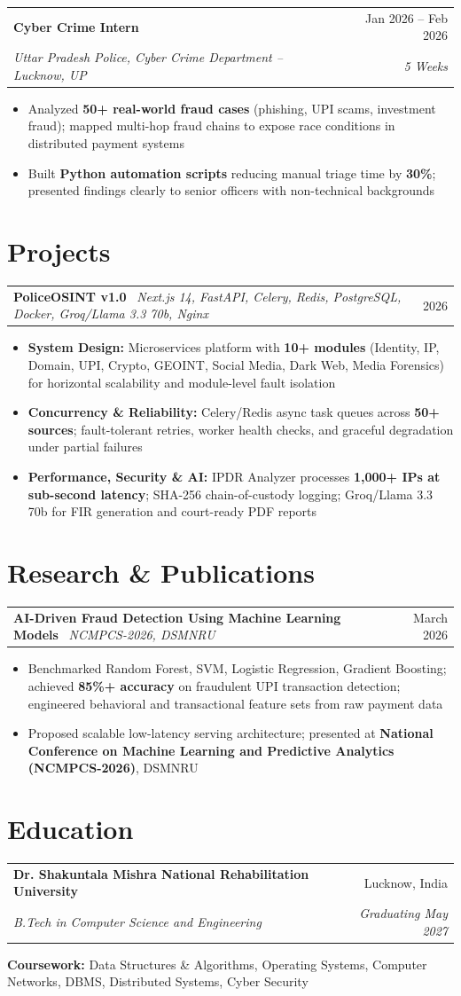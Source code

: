 \documentclass[letterpaper,10pt]{article}
\makeatletter
\newcommand{\rI}[1]{\item\small{#1}}
\newcommand{\rSH}[4]{%
  \vspace{1.5pt}\noindent
  \begin{tabular*}{\textwidth}{@{}l@{\extracolsep{\fill}}r@{}}
    \textbf{\small #1} & \small #2 \\[0.3pt]
    \textit{\small #3} & \textit{\small #4} \\[1.5pt]
  \end{tabular*}}
\newcommand{\rPH}[2]{%
  \vspace{1.5pt}\noindent
  \begin{tabular*}{\textwidth}{@{}l@{\extracolsep{\fill}}r@{}}
    \small #1 & \small #2 \\[1.5pt]
  \end{tabular*}}
\newcommand{\rLS}{\begin{itemize}[leftmargin=0.13in,label=\textbullet,topsep=0pt,itemsep=0pt,parsep=0pt]}
\newcommand{\rLE}{\end{itemize}\vspace{1.5pt}}
\makeatother
\begin{document}
{{\rSH{Cyber Crime Intern}{Jan 2026 -- Feb 2026}{Uttar Pradesh Police, Cyber Crime Department -- Lucknow, UP}{5 Weeks}
\rLS
  \rI{Analyzed \textbf{50+ real-world fraud cases} (phishing, UPI scams, investment fraud); mapped multi-hop fraud chains to expose race conditions in distributed payment systems}
  \rI{Built \textbf{Python automation scripts} reducing manual triage time by \textbf{30\%}; presented findings clearly to senior officers with non-technical backgrounds}
\rLE

\section{Projects}
\rPH{\textbf{PoliceOSINT v1.0} \textbullet\ \textit{Next.js 14, FastAPI, Celery, Redis, PostgreSQL, Docker, Groq/Llama 3.3 70b, Nginx}}{2026}
\rLS
  \rI{\textbf{System Design:} Microservices platform with \textbf{10+ modules} (Identity, IP, Domain, UPI, Crypto, GEOINT, Social Media, Dark Web, Media Forensics) for horizontal scalability and module-level fault isolation}
  \rI{\textbf{Concurrency \& Reliability:} Celery/Redis async task queues across \textbf{50+ sources}; fault-tolerant retries, worker health checks, and graceful degradation under partial failures}
  \rI{\textbf{Performance, Security \& AI:} IPDR Analyzer processes \textbf{1,000+ IPs at sub-second latency}; SHA-256 chain-of-custody logging; Groq/Llama 3.3 70b for FIR generation and court-ready PDF reports}
\rLE

\section{Research \& Publications}
\rPH{\textbf{AI-Driven Fraud Detection Using Machine Learning Models} \textbullet\ \textit{NCMPCS-2026, DSMNRU}}{March 2026}
\rLS
  \rI{Benchmarked Random Forest, SVM, Logistic Regression, Gradient Boosting; achieved \textbf{85\%+ accuracy} on fraudulent UPI transaction detection; engineered behavioral and transactional feature sets from raw payment data}
  \rI{Proposed scalable low-latency serving architecture; presented at \textbf{National Conference on Machine Learning and Predictive Analytics (NCMPCS-2026)}, DSMNRU}
\rLE

\section{Education}
\rSH{Dr. Shakuntala Mishra National Rehabilitation University}{Lucknow, India}{B.Tech in Computer Science and Engineering}{Graduating May 2027}
{\small\hspace{0.13in}\textbf{Coursework:} Data Structures \& Algorithms, Operating Systems, Computer Networks, DBMS, Distributed Systems, Cyber Security}\vspace{1pt}

}}
\end{document}
